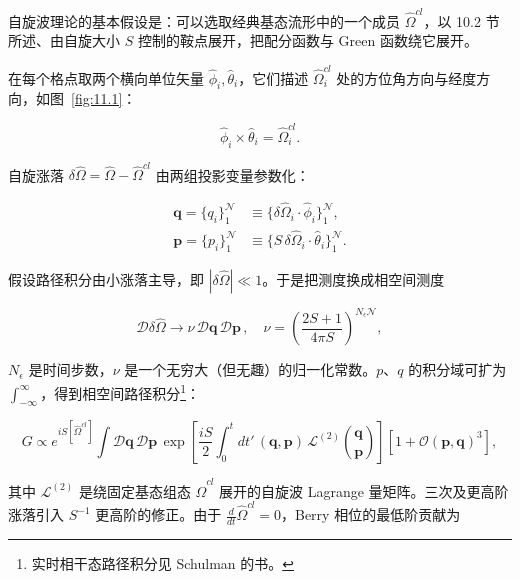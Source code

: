 自旋波理论的基本假设是：可以选取经典基态流形中的一个成员 $\hat{\Omega}^{cl}$，以 10.2 节所述、由自旋大小 $S$ 控制的鞍点展开，把配分函数与 Green 函数绕它展开。

在每个格点取两个横向单位矢量 $\hat{\phi}_{i}, \hat{\theta}_{i}$，它们描述 $\hat{\Omega}_{i}^{cl}$ 处的方位角方向与经度方向，如图~\ref{fig:11.1}：

\begin{equation*}
\hat {\phi} _ {i} \times \hat {\theta} _ {i} = \hat {\Omega} _ {i} ^ {cl}.
\tag{11.3}
\end{equation*}

自旋涨落 $\delta\hat{\Omega} = \hat{\Omega} - \hat{\Omega}^{cl}$ 由两组投影变量参数化：

\begin{align*}
\mathbf {q} = \{ q _ {i} \} _ {1} ^ {\mathcal {N}} & \equiv \{ \delta \hat {\Omega} _ {i} \cdot \hat {\phi} _ {i} \} _ {1} ^ {\mathcal {N}} ,\\
\mathbf {p} = \{ p _ {i} \} _ {1} ^ {\mathcal {N}} & \equiv \{ S \, \delta \hat {\Omega} _ {i} \cdot \hat {\theta} _ {i} \} _ {1} ^ {\mathcal {N}} .
\tag{11.4}
\end{align*}

假设路径积分由小涨落主导，即 $|\delta\hat{\Omega}| \ll 1$。于是把测度换成相空间测度

\begin{equation*}
\mathcal {D} \delta \hat {\Omega} \rightarrow \nu \, \mathcal {D} \mathbf {q} \, \mathcal {D} \mathbf {p} \, , \quad \nu = \left( \frac {2 S + 1}{4 \pi S} \right) ^ {N _ {\epsilon} \mathcal {N}} ,
\tag{11.5}
\end{equation*}

$N_{\epsilon}$ 是时间步数，$\nu$ 是一个无穷大（但无趣）的归一化常数。$p$、$q$ 的积分域可扩为 $\int_{-\infty}^{\infty}$，得到相空间路径积分\footnote{实时相干态路径积分见 Schulman 的书。}：

\begin{equation*}
G \propto e ^ {i S [ \hat {\Omega} ^ {cl} ]} \int \mathcal {D} \mathbf {q} \, \mathcal {D} \mathbf {p} \, \exp \left[ \frac {i S}{2} \int_ {0} ^ {t} d t ' \, (\mathbf {q}, \mathbf {p}) \, \mathcal {L} ^ {(2)} \binom{\mathbf {q}}{\mathbf {p}} \right] \left[ 1 + \mathcal {O} (\mathbf {p}, \mathbf {q}) ^ {3} \right] ,
\tag{11.6}
\end{equation*}

其中 $\mathcal{L}^{(2)}$ 是绕固定基态组态 $\hat{\Omega}^{cl}$ 展开的自旋波 Lagrange 量矩阵。三次及更高阶涨落引入 $S^{-1}$ 更高阶的修正。由于 $\frac{d}{dt}\hat{\Omega}^{cl}=0$，Berry 相位的最低阶贡献为

